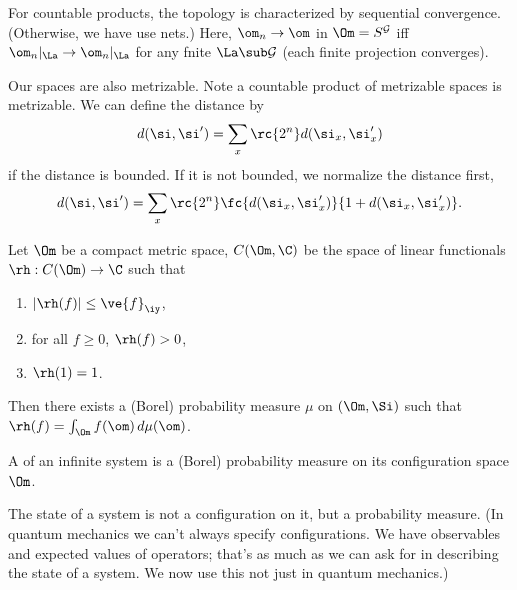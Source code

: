 For countable products, the topology is characterized by sequential convergence. (Otherwise, we have use nets.)
Here, $\om_n\to \om$ in $\Om=S^{\cal G}$ iff $\om_n|_\La\to \om_n|_\La$ for any fnite $\La\sub \cal G$ (each finite projection converges).

Our spaces are also metrizable. Note a countable product of metrizable spaces is metrizable. We can define the distance by
\[
d(\si,\si') = \sum_x \rc{2^n}d(\si_x,\si_x')
\]
if the distance is bounded. If it is not bounded, we normalize the distance first, 
\[
d(\si,\si') = \sum_x \rc{2^n}\fc{d(\si_x,\si_x')}{1+d(\si_x,\si_x')}.
\]

\begin{thm}
Let $\Om$ be a compact metric space, $C(\Om, \C)$ be the space of linear functionals $\rh:C(\Om)\to \C$ such that 
\begin{enumerate}
\item
$|\rh(f)|\le \ve{f}_{\iy}$,
\item
for all $f\ge 0$, $\rh(f)>0$,
\item
$\rh(1)=1$.
\end{enumerate}
Then there exists a (Borel) probability measure $\mu$ on $(\Om,\Si)$ such that $\rh(f) = \int_{\Om} f(\om)\,d\mu(\om)$.
\end{thm}
\begin{df}
A  of an infinite system is a (Borel) probability measure on its configuration space $\Om$.
\end{df}
The state of a system is not a configuration on it, but a probability measure. (In quantum mechanics we can't always specify configurations. We have observables and expected values of operators; that's as much as we can ask for in describing the state of a system. We now use this not just in quantum mechanics.)



